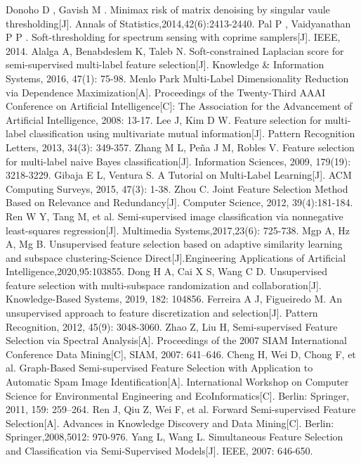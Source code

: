 \documentclass[final,3p,times]{elsarticle}
\begin{document}
{         Donoho D , Gavish M . Minimax risk of matrix denoising by singular vaule thresholding[J]. Annals of Statistics,2014,42(6):2413-2440.
         Pal P , Vaidyanathan P P . Soft-thresholding for spectrum sensing with coprime samplers[J]. IEEE, 2014.
         Alalga A, Benabdeslem K, Taleb N. Soft-constrained Laplacian score for semi-supervised multi-label feature selection[J]. Knowledge & Information Systems, 2016, 47(1): 75-98.   
         Menlo Park Multi-Label Dimensionality Reduction via Dependence Maximization[A]. Proceedings of the Twenty-Third AAAI Conference on Artificial Intelligence[C]: The Association for the           Advancement of Artificial Intelligence, 2008: 13-17.
         Lee J, Kim D W. Feature selection for multi-label classification using multivariate mutual information[J]. Pattern Recognition Letters, 2013, 34(3): 349-357.
         Zhang M L, Peña J M, Robles V. Feature selection for multi-label naive Bayes classification[J]. Information Sciences, 2009, 179(19): 3218-3229.
         Gibaja E L, Ventura S. A Tutorial on Multi-Label Learning[J]. ACM Computing Surveys, 2015, 47(3): 1-38.
         Zhou C. Joint Feature Selection Method Based on Relevance and Redundancy[J]. Computer Science, 2012, 39(4):181-184.
         Ren W Y, Tang M, et al. Semi-supervised image classification via nonnegative least-squares regression[J]. Multimedia Systems,2017,23(6): 725-738.
         Mgp A, Hz A, Mg B. Unsupervised feature selection based on adaptive similarity learning and subspace clustering-Science Direct[J].Engineering Applications of Artificial Intelligence,2020,95:103855. 
         Dong H A, Cai X S, Wang C D. Unsupervised feature selection with multi-subspace randomization and collaboration[J]. Knowledge-Based Systems, 2019, 182: 104856.
         Ferreira A J, Figueiredo M. An unsupervised approach to feature discretization and selection[J]. Pattern Recognition, 2012, 45(9): 3048-3060.
         Zhao Z, Liu H, Semi-supervised Feature Selection via Spectral Analysis[A]. Proceedings of the 2007 SIAM International Conference Data Mining[C], SIAM, 2007: 641–646.
         Cheng H, Wei D, Chong F, et al. Graph-Based Semi-supervised Feature Selection with Application to Automatic Spam Image Identification[A]. International Workshop on Computer Science for   Environmental Engineering and EcoInformatics[C]. Berlin: Springer, 2011, 159: 259–264.
         Ren J, Qiu Z, Wei F, et al. Forward Semi-supervised Feature Selection[A]. Advances in Knowledge Discovery and Data Mining[C]. Berlin: Springer,2008,5012: 970-976.
         Yang L, Wang L. Simultaneous Feature Selection and Classification via Semi-Supervised Models[J]. IEEE, 2007: 646-650.
}
\end{document}
